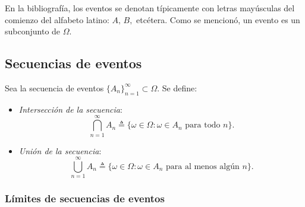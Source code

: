 \documentclass[a4paper]{report}
\begin{document}
En la bibliografía, los eventos se denotan típicamente con letras mayúsculas del comienzo del alfabeto latino: \(A,\,B,\) etcétera. Como se mencionó, un evento es un subconjunto de \(\Omega\).

\subsection{Secuencias de eventos}

 Sea la secuencia de eventos \(\{A_n\}_{n=1}^{\infty}\subset\Omega\). Se define: 
\begin{itemize}
 \item \emph{Intersección de la secuencia}:
 \[
  \bigcap_{n=1}^{\infty}A_n\triangleq\{\omega\in\Omega:\omega\in A_n\textrm{ para todo }n\}.
 \]
 \item \emph{Unión de la secuencia}:
 \[
  \bigcup_{n=1}^{\infty}A_n\triangleq\{\omega\in\Omega:\omega\in A_n\textrm{ para al menos algún }n\}.
 \]
\end{itemize}

\subsubsection{Límites de secuencias de eventos}\label{sec:events_sequences_limit}
\end{document}
